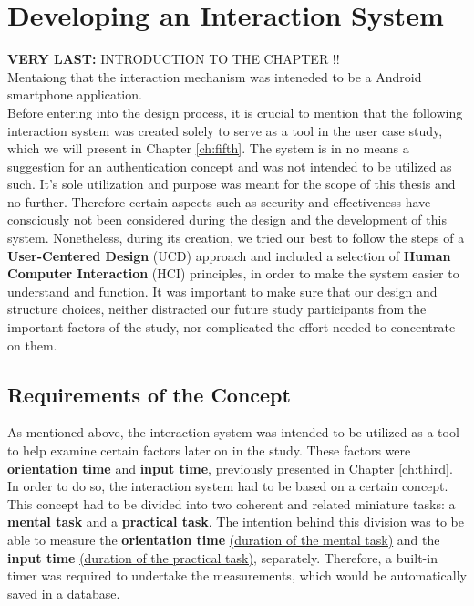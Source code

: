 
\chapter{Developing an Interaction System}\label{ch:forth}
\textbf{VERY LAST: }INTRODUCTION TO THE CHAPTER !!\\
Mentaiong that the interaction mechanism was inteneded to be a Android smartphone application.\\

Before entering into the design process, it is crucial to mention that the following interaction system was created solely to serve as a tool in the user case study, which we will present in Chapter \ref{ch:fifth}. The system is in no means a suggestion for an authentication concept and was not intended to be utilized as such. It's sole utilization and purpose was meant for the scope of this thesis and no further. Therefore certain aspects such as security and effectiveness have consciously not been considered during the design and the development of this system. Nonetheless, during its creation, we tried our best to follow the steps of a \textbf{User-Centered Design} (UCD) approach and included a selection of \textbf{Human Computer Interaction} (HCI) principles, in order to make the system easier to understand and function. It was important to make sure that our design and structure choices, neither distracted our future study participants from the important factors of the study, nor complicated the effort needed to concentrate on them.  


\section{Requirements of the Concept} \label{4.1}
As mentioned above, the interaction system was intended to be utilized as a tool to help examine certain factors later on in the study. These factors were \textbf{orientation time} and \textbf{input time}, previously presented in Chapter \ref{ch:third}. In order to do so, the interaction system had to be based on a certain concept. This concept had to be divided into two coherent and related miniature tasks: a \textbf{mental task} and a \textbf{practical task}. The intention behind this division was to be able to measure the \textbf{orientation time} \underline{(duration of the mental task)} and the \textbf{input time} \underline{(duration of the practical task)}, separately. Therefore, a built-in timer was required to undertake the measurements, which would be automatically saved in a database. \\

